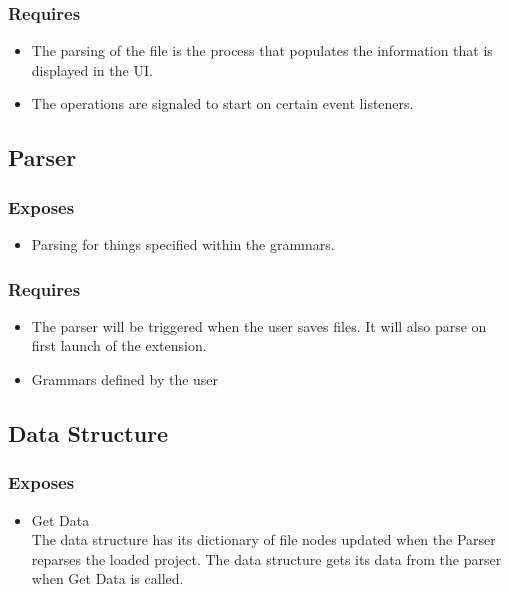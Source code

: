 \documentclass[letterpaper,10pt,titlepage,draftclsnofoot,onecolumn,onesided] {IEEEtran}
\begin{document}
		\subsubsection{Requires}
			\begin{itemize}
			\item The parsing of the file is the process that populates the information that is displayed in the UI.
			\item The operations are signaled to start on certain event listeners.
			\end{itemize}
			
	\subsection{Parser}
		\subsubsection{Exposes}
			\begin{itemize}
			\item Parsing for things specified within the grammars.
			\end{itemize}
		\subsubsection{Requires}
			\begin{itemize}
			\item The parser will be triggered when the user saves files. 
			It will also parse on first launch of the extension.
			\item Grammars defined by the user
			\end{itemize}
	
	\subsection{Data Structure}
		\subsubsection{Exposes}
		\begin{itemize}
			\item Get Data
			\\
			The data structure has its dictionary of file nodes updated when the Parser reparses the loaded project. 
			The data structure gets its data from the parser when Get Data is called.
		\end{itemize}
\end{document}
